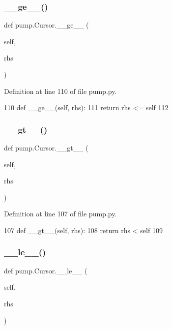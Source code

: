 \subsubsection{\texorpdfstring{\+\_\+\+\_\+ge\+\_\+\+\_\+()}{\_\_ge\_\_()}}
{\footnotesize\ttfamily def pump.\+Cursor.\+\_\+\+\_\+ge\+\_\+\+\_\+ (\begin{DoxyParamCaption}\item[{}]{self,  }\item[{}]{rhs }\end{DoxyParamCaption})}



Definition at line 110 of file pump.\+py.


\begin{DoxyCode}
110   \textcolor{keyword}{def }\_\_ge\_\_(self, rhs):
111     \textcolor{keywordflow}{return} rhs <= self
112 
\end{DoxyCode}
\mbox{\label{classpump_1_1Cursor_aa6109b9e7048e6260c2018a6d8878739}} 
\subsubsection{\texorpdfstring{\+\_\+\+\_\+gt\+\_\+\+\_\+()}{\_\_gt\_\_()}}
{\footnotesize\ttfamily def pump.\+Cursor.\+\_\+\+\_\+gt\+\_\+\+\_\+ (\begin{DoxyParamCaption}\item[{}]{self,  }\item[{}]{rhs }\end{DoxyParamCaption})}



Definition at line 107 of file pump.\+py.


\begin{DoxyCode}
107   \textcolor{keyword}{def }\_\_gt\_\_(self, rhs):
108     \textcolor{keywordflow}{return} rhs < self
109 
\end{DoxyCode}
\mbox{\label{classpump_1_1Cursor_a7652488b46ecf1dfa4d0a83bff9411ab}} 
\subsubsection{\texorpdfstring{\+\_\+\+\_\+le\+\_\+\+\_\+()}{\_\_le\_\_()}}
{\footnotesize\ttfamily def pump.\+Cursor.\+\_\+\+\_\+le\+\_\+\+\_\+ (\begin{DoxyParamCaption}\item[{}]{self,  }\item[{}]{rhs }\end{DoxyParamCaption})}



